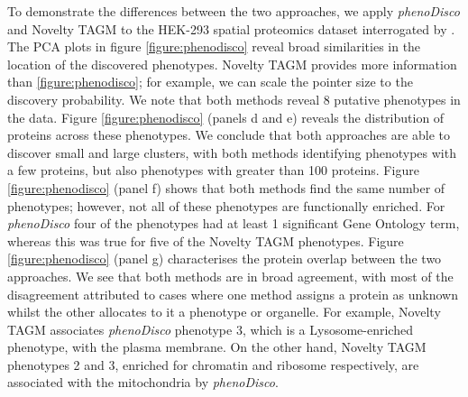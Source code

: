\documentclass[12pt,english]{article}
\begin{document}
To demonstrate the differences between the two approaches, we apply \textit{phenoDisco} and Novelty TAGM to the HEK-293 spatial proteomics dataset interrogated by \citep{Breckels:2013}. The PCA plots in figure \ref{figure:phenodisco} reveal broad similarities in the location of the discovered phenotypes. Novelty TAGM provides more information than \ref{figure:phenodisco}; for example, we can scale the pointer size to the discovery probability. We note that both methods reveal 8 putative phenotypes in the data. Figure \ref{figure:phenodisco} (panels d and e) reveals the distribution of proteins across these phenotypes. We conclude that both approaches are able to discover small and large clusters, with both methods identifying phenotypes with a few proteins, but also phenotypes with greater than 100 proteins. Figure \ref{figure:phenodisco} (panel f) shows that both methods find the same number of phenotypes; however, not all of these phenotypes are functionally enriched. For \textit{phenoDisco} four of the phenotypes had at least 1 significant Gene Ontology term, whereas this was true for five of the Novelty TAGM phenotypes. Figure \ref{figure:phenodisco} (panel g) characterises the protein overlap between the two approaches. We see that both methods are in broad agreement, with most of the disagreement attributed to cases where one method assigns a protein as unknown whilst the other allocates to it a phenotype or organelle. For example, Novelty TAGM associates \textit{phenoDisco} phenotype 3, which is a Lysosome-enriched phenotype, with the plasma membrane. On the other hand, Novelty TAGM phenotypes 2 and 3, enriched for chromatin and ribosome respectively, are associated with the mitochondria by \textit{phenoDisco}.
\end{document}
